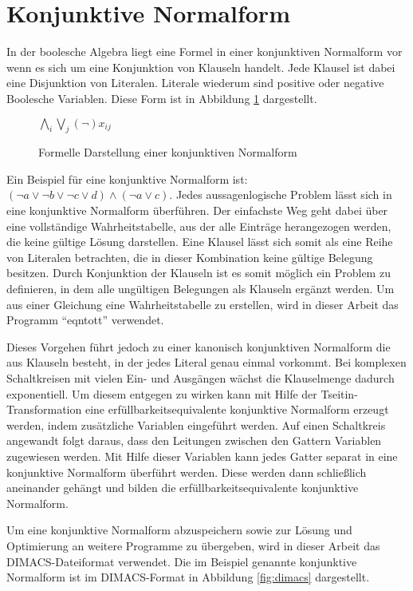 \section{Konjunktive Normalform}
\label{sec:knf}

In der boolesche Algebra liegt eine Formel in einer konjunktiven Normalform vor wenn es sich um eine Konjunktion von Klauseln handelt.
Jede Klausel ist dabei eine Disjunktion von Literalen. Literale wiederum sind positive oder negative Boolesche Variablen. Diese Form
ist in Abbildung \ref{fig:knf} dargestellt.

\begin{figure}[!h]
  \centering
  $ \bigwedge\limits_{i} \bigvee\limits_{j} (\neg)x_{ij} $
  \caption{Formelle Darstellung einer konjunktiven Normalform}
  \label{fig:knf}
\end{figure}

Ein Beispiel für eine konjunktive Normalform ist: $ (\neg a \vee \neg b \vee \neg c \vee d) \wedge (\neg a \vee c) $.
Jedes aussagenlogische Problem lässt sich in eine konjunktive Normalform überführen. Der einfachste Weg geht dabei über
eine vollständige Wahrheitstabelle, aus der alle Einträge herangezogen werden, die keine gültige Lösung darstellen. Eine
Klausel lässt sich somit als eine Reihe von Literalen betrachten, die in dieser Kombination keine gültige Belegung besitzen.
Durch Konjunktion der Klauseln ist es somit möglich ein Problem zu definieren, in dem alle ungültigen Belegungen als
Klauseln ergänzt werden. Um aus einer Gleichung eine Wahrheitstabelle zu erstellen, wird in dieser Arbeit das Programm
"`eqntott"' verwendet.

Dieses Vorgehen führt jedoch zu einer kanonisch konjunktiven Normalform die aus Klauseln besteht, in der jedes Literal
genau einmal vorkommt. Bei komplexen Schaltkreisen mit vielen Ein- und Ausgängen wächst die Klauselmenge dadurch exponentiell.
Um diesem entgegen zu wirken kann mit Hilfe der Tseitin-Transformation \cite{wiki:tseitin} eine erfüllbarkeitsequivalente
konjunktive Normalform erzeugt werden, indem zusätzliche Variablen eingeführt werden. Auf einen Schaltkreis angewandt folgt daraus,
dass den Leitungen zwischen den Gattern Variablen zugewiesen werden. Mit Hilfe dieser Variablen kann jedes Gatter separat in eine
konjunktive Normalform überführt werden. Diese werden dann schließlich aneinander gehängt und bilden die erfüllbarkeitsequivalente
konjunktive Normalform.

Um eine konjunktive Normalform abzuspeichern sowie zur Lösung und Optimierung an weitere Programme zu übergeben, wird in dieser
Arbeit das DIMACS-Dateiformat verwendet. Die im Beispiel genannte konjunktive Normalform ist im DIMACS-Format in Abbildung
\ref{fig:dimacs} dargestellt.


